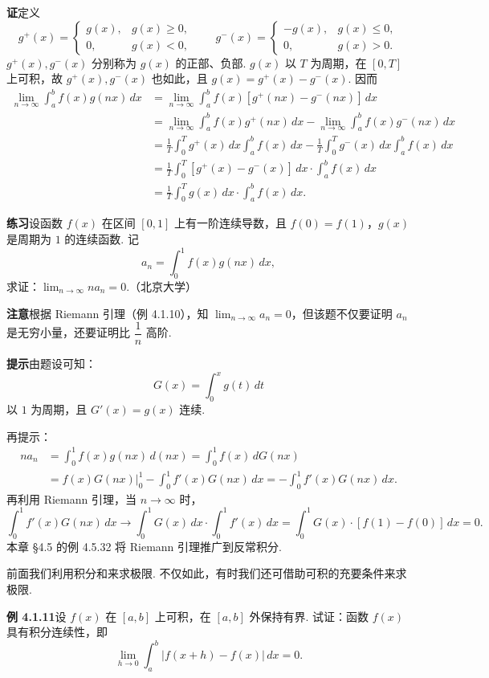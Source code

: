 \documentclass[UTF8,12pt,a4paper,fontset=fandol]{ctexart}
\begin{document}
\noindent\textbf{证}\quad 定义
\[
g^+(x)=
\begin{cases}
g(x),& g(x)\ge0,\\
0,& g(x)<0,
\end{cases}
\qquad
g^-(x)=
\begin{cases}
-g(x),& g(x)\le0,\\
0,& g(x)>0.
\end{cases}
\]
$g^+(x),g^-(x)$ 分别称为 $g(x)$ 的正部、负部. $g(x)$ 以 $T$ 为周期，在 $[0,T]$ 上可积，故 $g^+(x),g^-(x)$ 也如此，且 $g(x)=g^+(x)-g^-(x)$. 因而
\[
\begin{aligned}
\lim_{n\to\infty}\int_a^b f(x)g(nx)\,dx
&=\lim_{n\to\infty}\int_a^b f(x)[g^+(nx)-g^-(nx)]\,dx\\
&=\lim_{n\to\infty}\int_a^b f(x)g^+(nx)\,dx
-\lim_{n\to\infty}\int_a^b f(x)g^-(nx)\,dx\\
&=\frac1T\int_0^T g^+(x)\,dx\int_a^b f(x)\,dx
-\frac1T\int_0^T g^-(x)\,dx\int_a^b f(x)\,dx\\
&=\frac1T\int_0^T[g^+(x)-g^-(x)]\,dx\cdot\int_a^b f(x)\,dx\\
&=\frac1T\int_0^T g(x)\,dx\cdot\int_a^b f(x)\,dx.
\end{aligned}
\]

\noindent\textbf{练习}\quad 设函数 $f(x)$ 在区间 $[0,1]$ 上有一阶连续导数，且 $f(0)=f(1)$，$g(x)$ 是周期为 $1$ 的连续函数. 记
\[
a_n=\int_0^1 f(x)g(nx)\,dx,
\]
求证：$\displaystyle\lim_{n\to\infty}na_n=0$.（北京大学）

\noindent\textbf{注意}\quad 根据 Riemann 引理（例 4.1.10），知 $\displaystyle\lim_{n\to\infty}a_n=0$，但该题不仅要证明 $a_n$ 是无穷小量，还要证明比 $\dfrac1n$ 高阶.

\noindent\textbf{提示}\quad 由题设可知：
\[
G(x)=\int_0^x g(t)\,dt
\]
以 $1$ 为周期，且 $G'(x)=g(x)$ 连续.

再提示：
\[
\begin{aligned}
na_n
&=\int_0^1 f(x)g(nx)\,d(nx)
=\int_0^1 f(x)\,dG(nx)\\
&=f(x)G(nx)\bigg|_0^1-\int_0^1 f'(x)G(nx)\,dx
=-\int_0^1 f'(x)G(nx)\,dx.
\end{aligned}
\]
再利用 Riemann 引理，当 $n\to\infty$ 时，
\[
\int_0^1 f'(x)G(nx)\,dx
\to \int_0^1G(x)\,dx\cdot\int_0^1f'(x)\,dx
=\int_0^1G(x)\cdot[f(1)-f(0)]\,dx=0.
\]
本章 §4.5 的例 4.5.32 将 Riemann 引理推广到反常积分.

前面我们利用积分和来求极限. 不仅如此，有时我们还可借助可积的充要条件来求极限.

\noindent\textbf{例 4.1.11}\quad 设 $f(x)$ 在 $[a,b]$ 上可积，在 $[a,b]$ 外保持有界. 试证：函数 $f(x)$ 具有积分连续性，即
\[
\lim_{h\to0}\int_a^b|f(x+h)-f(x)|\,dx=0.
\]
\end{document}

